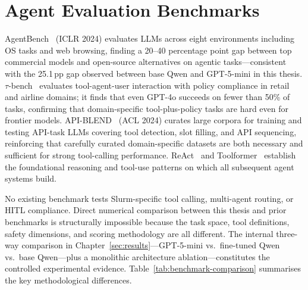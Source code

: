 \section{Agent Evaluation Benchmarks}

AgentBench~\cite{liu2023agentbench} (ICLR 2024) evaluates LLMs across eight environments including OS tasks and web browsing, finding a 20--40 percentage point gap between top commercial models and open-source alternatives on agentic tasks---consistent with the 25.1\,pp gap observed between base Qwen and GPT-5-mini in this thesis. $\tau$-bench~\cite{yao2024taubench} evaluates tool-agent-user interaction with policy compliance in retail and airline domains; it finds that even GPT-4o succeeds on fewer than 50\% of tasks, confirming that domain-specific tool-plus-policy tasks are hard even for frontier models. API-BLEND~\cite{basu2024apiblend} (ACL 2024) curates large corpora for training and testing API-task LLMs covering tool detection, slot filling, and API sequencing, reinforcing that carefully curated domain-specific datasets are both necessary and sufficient for strong tool-calling performance. ReAct~\cite{yao2022react} and Toolformer~\cite{schick2023toolformer} establish the foundational reasoning and tool-use patterns on which all subsequent agent systems build.

No existing benchmark tests Slurm-specific tool calling, multi-agent routing, or HITL compliance. Direct numerical comparison between this thesis and prior benchmarks is structurally impossible because the task space, tool definitions, safety dimensions, and scoring methodology are all different. The internal three-way comparison in Chapter~\ref{sec:results}---GPT-5-mini vs.\ fine-tuned Qwen vs.\ base Qwen---plus a monolithic architecture ablation---constitutes the controlled experimental evidence. Table~\ref{tab:benchmark-comparison} summarises the key methodological differences.

